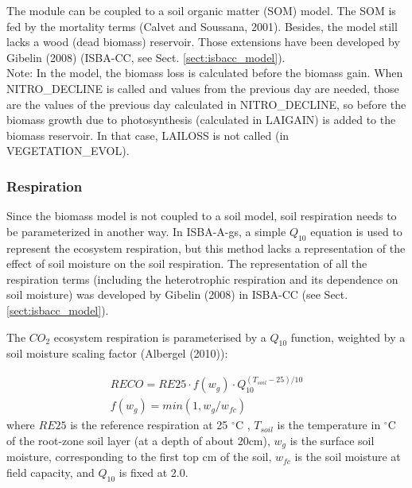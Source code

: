 {The module can be coupled to a soil organic matter (SOM) model. The SOM is fed by the mortality
terms (Calvet and Soussana, 2001). Besides, the model still lacks a wood (dead biomass) reservoir.
Those extensions have been developed by Gibelin \etal (2008) (ISBA-CC, see Sect. \ref{sect:isbacc_model}). \\

Note: In the model, the biomass loss is calculated before the biomass gain. When NITRO\_DECLINE is
called and values from the previous day are needed, those are the values of the previous day
calculated in NITRO\_DECLINE, so before the biomass growth due to photosynthesis (calculated in
LAIGAIN) is added to the biomass reservoir. In that case, LAILOSS is not called (in
VEGETATION\_EVOL).

\subsubsection{Respiration}

Since the biomass model is not coupled to a soil model, soil respiration needs to be parameterized in
another way. In ISBA-A-gs, a simple $Q_{10}$ equation is used to represent the ecosystem respiration, but
this method lacks a representation of the effect of soil moisture on the soil respiration. The
representation of all the respiration terms (including the heterotrophic respiration and its dependence
on soil moisture) was developed by Gibelin \etal (2008) in ISBA-CC (see Sect. \ref{sect:isbacc_model}).

The $CO_{2}$ ecosystem respiration is parameterised by a $Q_{10}$ function, weighted by a soil moisture 
scaling factor (Albergel \etal (2010)\nocite{Albergel2010}):

\begin{eqnarray}
RECO=RE25 \cdot f(w_g) \cdot Q_{10}^{(T_{soil}-25)/10}   \\
f(w_g)=min(1,w_g / w_{fc})
\end{eqnarray}
where $RE25$ is the reference respiration at 25 $^{\circ}$C , $T_{soil}$ is the temperature in $^{\circ}$C of the 
root-zone soil layer (at a depth of about 20cm), $w_g$ is the surface soil moisture, corresponding to the first 
top cm of the soil, $w_{fc}$ is the soil moisture at field capacity, and $Q_{10}$ is fixed at 2.0.


}
